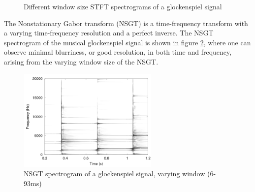 \documentclass[report.tex]{subfiles}
\begin{document}
\begin{figure}[ht]
	\centering
	\hspace{0.5em}
	\caption{Different window size STFT spectrograms of a glockenspiel signal}
	\label{fig:stfttradeoff}
\end{figure}

The Nonstationary Gabor transform (NSGT) \cite{balazs} is a time-frequency transform with a varying time-frequency resolution and a perfect inverse. The NSGT spectrogram of the musical glockenspiel signal is shown in figure \ref{fig:nsgttradeoff}, where one can observe minimal blurriness, or good resolution, in both time and frequency, arising from the varying window size of the NSGT.

\begin{figure}[ht]
	\centering
	\includegraphics[height=5cm]{./images-tftheory/tf_tradeoff_balasz3.png}
	\caption{NSGT spectrogram of a glockenspiel signal, varying window (6-93ms)}
	\label{fig:nsgttradeoff}
\end{figure}
\end{document}
